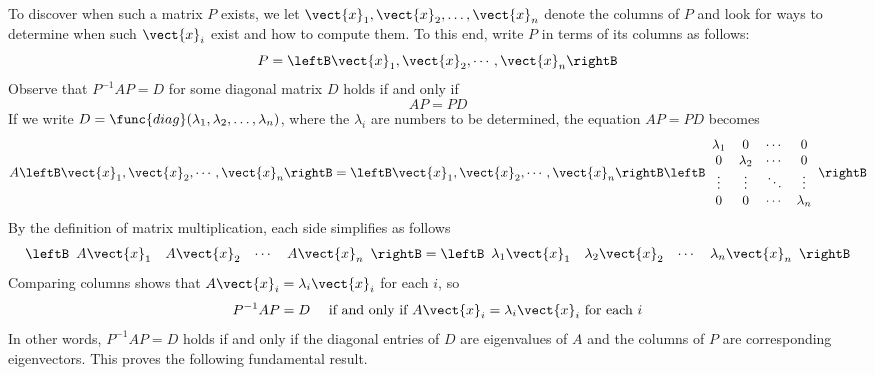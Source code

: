 To discover when such a matrix $P$ exists, we let $\vect{x}_{1}, \vect{x}_{2}, \dots , \vect{x}_{n}$ denote the columns of $P$ and look for ways to determine when such $\vect{x}_{i}$ exist and how to compute them. To this end, write $P$ in terms of its columns as follows:
\begin{equation*}
P = \leftB \vect{x}_1, \vect{x}_2, \cdots, \vect{x}_n \rightB
\end{equation*}
Observe that $P^{-1}AP = D$ for some diagonal matrix $D$ holds if and only if
\begin{equation*}
AP = PD
\end{equation*}
If we write $D = \func{diag}(\lambda_{1}, \lambda_{2}, \dots , \lambda_{n})$, where the $\lambda_{i}$ are numbers to be determined, the equation $AP = PD$ becomes
\begin{equation*}
A\leftB \vect{x}_1, \vect{x}_2, \cdots, \vect{x}_n \rightB = \leftB \vect{x}_1, \vect{x}_2, \cdots, \vect{x}_n \rightB \leftB \begin{array}{cccc}
\lambda_1 & 0 & \cdots & 0 \\
0 & \lambda_2 & \cdots & 0 \\
\vdots & \vdots & \ddots & \vdots \\
0 & 0 & \cdots & \lambda_n \end{array}\rightB
\end{equation*}
By the definition of matrix multiplication, each side simplifies as follows
\begin{equation*}
\leftB \begin{array}{cccc}
A\vect{x}_1 & A\vect{x}_2 & \cdots & A\vect{x}_n 
\end{array}\rightB = \leftB \begin{array}{cccc}
\lambda_1 \vect{x}_1 & \lambda_2 \vect{x}_2 & \cdots & \lambda_n \vect{x}_n 
\end{array}\rightB\end{equation*}
Comparing columns shows that $A\vect{x}_{i} = \lambda_{i}\vect{x}_{i}$ for each $i$, so
\begin{equation*}
P^{-1}AP = D \quad \mbox{ if and only if } A\vect{x}_i = \lambda_i \vect{x}_i \mbox{ for each } i
\end{equation*}
In other words, $P^{-1}AP = D$ holds if and only if the diagonal entries of $D$ are eigenvalues of $A$ and the columns of $P$ are corresponding eigenvectors. This proves the following fundamental result.


